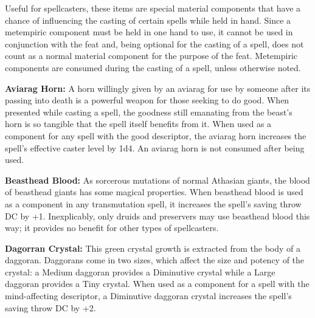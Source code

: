 Useful for spellcasters, these items are special material components that have a chance of influencing the casting of certain spells while held in hand. Since a metempiric component must be held in one hand to use, it cannot be used in conjunction with the  feat and, being optional for the casting of a spell, does not count as a normal material component for the purpose of the  feat. Metempiric components are consumed during the casting of a spell, unless otherwise noted.


\textbf{Aviarag Horn:} A horn willingly given by an aviarag for use by someone after its passing into death is a powerful weapon for those seeking to do good. When presented while casting a spell, the goodness still emanating from the beast's horn is so tangible that the spell itself benefits from it. When used as a component for any spell with the good descriptor, the aviarag horn increases the spell's effective caster level by 1d4. An aviarag horn is not consumed after being used.

\textbf{Beasthead Blood:} As sorcerous mutations of normal Athasian giants, the blood of beasthead giants has some magical properties. When beasthead blood is used as a component in any transmutation spell, it increases the spell's saving throw DC by +1. Inexplicably, only druids and preservers may use beasthead blood this way; it provides no benefit for other types of spellcasters.

\textbf{Dagorran Crystal:} This green crystal growth is extracted from the body of a daggoran. Daggorans come in two sizes, which affect the size and potency of the crystal: a Medium daggoran provides a Diminutive crystal while a Large daggoran provides a Tiny crystal. When used as a component for a spell with the mind-affecting descriptor, a Diminutive daggoran crystal increases the spell's saving throw DC by +2.

